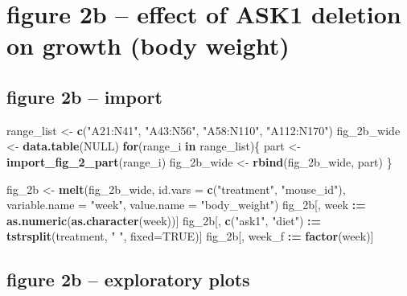\documentclass[]{book}
\newenvironment{Shaded}{\begin{snugshade}}{\end{snugshade}}
\newcommand{\ControlFlowTok}[1]{\textcolor[rgb]{0.13,0.29,0.53}{\textbf{#1}}}
\newcommand{\DataTypeTok}[1]{\textcolor[rgb]{0.13,0.29,0.53}{#1}}
\newcommand{\ErrorTok}[1]{\textcolor[rgb]{0.64,0.00,0.00}{\textbf{#1}}}
\newcommand{\KeywordTok}[1]{\textcolor[rgb]{0.13,0.29,0.53}{\textbf{#1}}}
\newcommand{\NormalTok}[1]{#1}
\newcommand{\OperatorTok}[1]{\textcolor[rgb]{0.81,0.36,0.00}{\textbf{#1}}}
\newcommand{\OtherTok}[1]{\textcolor[rgb]{0.56,0.35,0.01}{#1}}
\newcommand{\StringTok}[1]{\textcolor[rgb]{0.31,0.60,0.02}{#1}}
\begin{document}
\hypertarget{figure-2b-effect-of-ask1-deletion-on-growth-body-weight}{%
\section{figure 2b -- effect of ASK1 deletion on growth (body weight)}\label{figure-2b-effect-of-ask1-deletion-on-growth-body-weight}}

\hypertarget{figure-2b-import}{%
\subsection{figure 2b -- import}\label{figure-2b-import}}

\begin{Shaded}
\begin{Highlighting}[]
\NormalTok{range_list <-}\StringTok{ }\KeywordTok{c}\NormalTok{(}\StringTok{"A21:N41"}\NormalTok{, }\StringTok{"A43:N56"}\NormalTok{, }\StringTok{"A58:N110"}\NormalTok{, }\StringTok{"A112:N170"}\NormalTok{)}
\NormalTok{fig_2b_wide <-}\StringTok{ }\KeywordTok{data.table}\NormalTok{(}\OtherTok{NULL}\NormalTok{)}
\ControlFlowTok{for}\NormalTok{(range_i }\ControlFlowTok{in}\NormalTok{ range_list)\{}
\NormalTok{  part <-}\StringTok{ }\KeywordTok{import_fig_2_part}\NormalTok{(range_i)}
\NormalTok{  fig_2b_wide <-}\StringTok{ }\KeywordTok{rbind}\NormalTok{(fig_2b_wide,}
\NormalTok{                       part)}
\NormalTok{\}}

\NormalTok{fig_2b <-}\StringTok{ }\KeywordTok{melt}\NormalTok{(fig_2b_wide,}
               \DataTypeTok{id.vars =} \KeywordTok{c}\NormalTok{(}\StringTok{"treatment"}\NormalTok{, }\StringTok{"mouse_id"}\NormalTok{),}
               \DataTypeTok{variable.name =} \StringTok{"week"}\NormalTok{,}
               \DataTypeTok{value.name =} \StringTok{"body_weight"}\NormalTok{)}
\NormalTok{fig_2b[, week }\OperatorTok{:}\ErrorTok{=}\StringTok{ }\KeywordTok{as.numeric}\NormalTok{(}\KeywordTok{as.character}\NormalTok{(week))]}
\NormalTok{fig_2b[, }\KeywordTok{c}\NormalTok{(}\StringTok{"ask1"}\NormalTok{, }\StringTok{"diet"}\NormalTok{) }\OperatorTok{:}\ErrorTok{=}\StringTok{ }\KeywordTok{tstrsplit}\NormalTok{(treatment, }\StringTok{" "}\NormalTok{, }\DataTypeTok{fixed=}\OtherTok{TRUE}\NormalTok{)]}
\NormalTok{fig_2b[, week_f }\OperatorTok{:}\ErrorTok{=}\StringTok{ }\KeywordTok{factor}\NormalTok{(week)]}
\end{Highlighting}
\end{Shaded}

\hypertarget{figure-2b-exploratory-plots}{%
\subsection{figure 2b -- exploratory plots}\label{figure-2b-exploratory-plots}}
\end{document}
